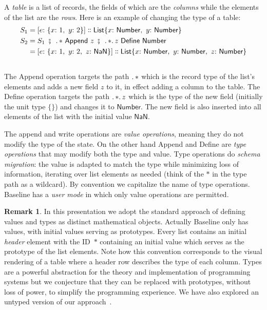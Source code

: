 \documentclass[english,submission]{programming}
\theoremstyle{definition}
\newtheorem*{remark}{Remark}
\newcommand{\mathbox}[1]{\colorbox{black!10}{$#1$\phantom{i\hspace{-3.5pt}}}}
\DeclareMathOperator{\exec}{\ \fatsemi\ \ }
\newcommand{\is}{{:}\ }
\newcommand{\comma}{,\ }
\newcommand{\isa}{\dblcolon}
\begin{document}
A \textit{table} is a list of records, the fields of which are the \textit{columns} while the elements of the list are the \textit{rows}. Here is an example of changing the type of a table:
\begin{align*}
S_1 &= [e \is \{x \is 1 \comma  y \is 2\}] \isa \textsf{List} \{x \is \textsf{Number}\comma  y \is \textsf{Number}\}\\
S_2 &= S_1 \exec \ldotp * \textsf{ Append } z \exec \ldotp * \ldotp z \textsf{ Define Number}\\
 &= [e \is \{x \is 1\comma  y \is 2,\ z\is \textsf{NaN}\}] \isa \textsf{List} \{x \is \textsf{Number}\comma  y \is \textsf{Number}\comma z\is \textsf{Number}\}\\
\end{align*}
\vspace{-30pt}\\
The \textsf{Append} operation targets the path \mathbox{\ldotp *} which is the record type of the list's elements and adds a new field \mathbox{z} to it, in effect adding a column to the table. The \textsf{Define} operation targets the path \mathbox{\ldotp  * \ldotp z} which is the type of the new field (initially the unit type \mathbox{\{\}}) and changes it to \mathbox{\textsf{Number}}. The new field is also inserted into all elements of the list with the initial value \mathbox{\textsf{NaN}}.

The \textsf{append} and \textsf{write} operations are \textit{value operations}, meaning they do not modify the type of the state. On the other hand \textsf{Append} and \textsf{Define} are \textit{type operations} that may modify both the type and value. Type operations do \textit{schema migration}: the value is adapted to match the type while minimizing loss of information, iterating over list elements as needed (think of the \mathbox{*} in the type path as a wildcard). By convention we capitalize the name of type operations. Baseline has a \textit{user mode} in which only value operations are permitted.

\begin{remark}
In this presentation we adopt the standard approach of defining values and types as distinct mathematical objects. Actually Baseline only has values, with initial values serving as prototypes. Every list contains an initial \textit{header} element with the ID~\mathbox{*} containing an initial value which serves as the prototype of the list elements. Note how this convention corresponds to the visual rendering of a table where a header row describes the type of each column. Types are a powerful abstraction for the theory and implementation of programming systems but we conjecture that they can be replaced with prototypes, without loss of power, to simplify the programming experience. We have also explored an untyped version of our approach~\cite{denicek}.
\end{remark}
\end{document}
